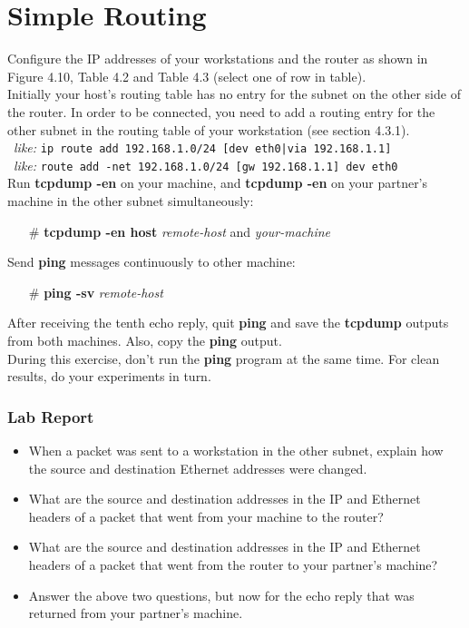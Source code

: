 \documentclass[10pt,a4paper]{article}
\numberwithin{equation}{section}
\numberwithin{figure}{section}
\numberwithin{table}{section}
\begin{document}
\section{Simple Routing}
    Configure the IP addresses of your workstations and the router as shown in Figure 4.10, Table 4.2 and Table 4.3 (select one of row in table). \\
    Initially your host’s routing table has no entry for the subnet on the other side of the router.
    In order to be connected, you need to add a routing entry for the other subnet in the routing table of your workstation (see section 4.3.1). \\
    \, \textit{like: }\texttt{ip route add 192.168.1.0/24 [dev eth0|via 192.168.1.1]} \\
    \, \textit{like: }\texttt{route add -net 192.168.1.0/24 [gw 192.168.1.1] dev eth0}\\
    Run \textbf{tcpdump -en} on your machine, and \textbf{tcpdump -en} on your partner’s machine in the other subnet simultaneously:
    \begin{itemize}
        \item [\#] \textbf{tcpdump -en host} \textit{remote-host} and \textit{your-machine}
    \end{itemize}
    Send \textbf{ping} messages continuously to other machine:
    \begin{itemize}
        \item [\#] \textbf{ping -sv} \textit{remote-host}
    \end{itemize}
    After receiving the tenth echo reply, quit \textbf{ping} and save the \textbf{tcpdump} outputs from both machines.
    Also, copy the \textbf{ping} output. \\
    During this exercise, don’t run the \textbf{ping} program at the same time.
    For clean results, do your experiments in turn.
    \subsubsection*{Lab Report}
    \begin{itemize}
        \setlength{\itemindent}{0pt}
        \item When a packet was sent to a workstation in the other subnet, explain how the source and destination Ethernet addresses were changed.
        \item What are the source and destination addresses in the IP and Ethernet headers of a packet that went from your machine to the router?
        \item What are the source and destination addresses in the IP and Ethernet headers of a packet that went from the router to your partner’s machine?
        \item Answer the above two questions, but now for the echo reply that was returned from your partner’s machine.
    \end{itemize}
\end{document}
